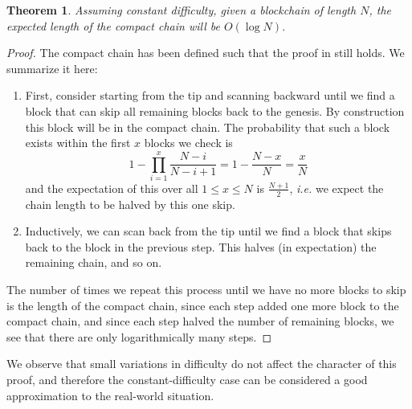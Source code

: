 \documentclass[letterpaper]{article}
\newtheorem{thrm}{Theorem}
\begin{document}
\begin{thrm} Assuming constant difficulty, given a blockchain of length
$N$, the expected length of the compact chain will be $O(\log N)$.
\end{thrm}
\begin{proof} The compact chain has been defined such that the proof in
\cite[Appendix A]{back+corallo+dashjr+friedenbach+maxwell+miller+poelstra+timon+wuille2014}
still holds. We summarize it here:
\begin{enumerate}
\item First, consider starting from the tip and scanning backward until
we find a block that can skip all remaining blocks back to the genesis.
By construction this block will be in the compact chain. The probability
that such a block exists within the first $x$ blocks we check is
\[ 1 - \prod_{i=1}^x \frac{N-i}{N-i+1} = 1 - \frac{N-x}{N} = \frac{x}N \]
and the expectation of this over all $1\leq x \leq N$ is $\frac{N+1}2$,
\emph{i.e.} we expect the chain length to be halved by this one skip.
\item Inductively, we can scan back from the tip until we find a block
that skips back to the block in the previous step. This halves (in
expectation) the remaining chain, and so on. 
\end{enumerate}
The number of times we repeat this process until we have no more blocks
to skip is the length of the compact chain, since each step added one
more block to the compact chain, and since each step halved the number
of remaining blocks, we see that there are only logarithmically many
steps.
\end{proof}
We observe that small variations in difficulty do not affect the character
of this proof, and therefore the constant-difficulty case can be considered
a good approximation to the real-world situation.
\end{document}

